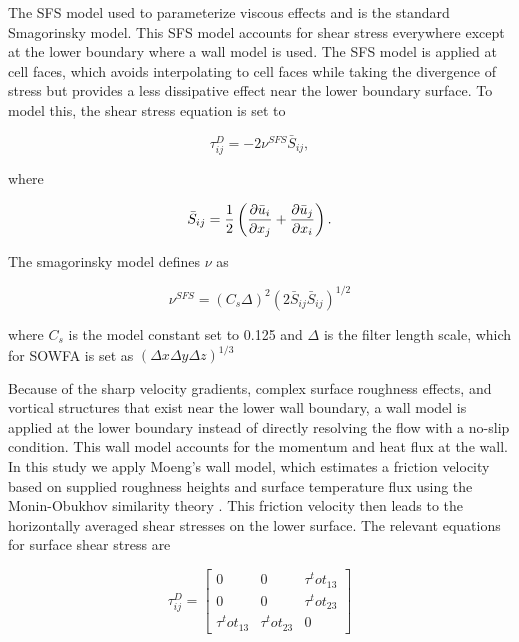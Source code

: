 The SFS model used to parameterize viscous effects and is the standard Smagorinsky model.  This SFS model accounts for shear stress everywhere except at the lower boundary where a wall model is used.  The SFS model is applied at cell faces, which avoids interpolating to cell faces while taking the divergence of stress but provides a less dissipative effect near the lower boundary surface.  To model this, the shear stress equation is set to

\begin{equation}
   \label{eq:smagorinsky}
   \tau^D_{ij} = -2 \nu^{SFS} \bar{S}_{ij},
\end{equation}

where

\begin{equation}
   \bar{S}_{ij} = \frac{1}{2} \left( \frac{\partial \bar{u}_i}{\partial x_j} + \frac{\partial \bar{u}_j}{\partial x_i} \right).
\end{equation}

The smagorinsky model defines $\nu$ as

\begin{equation}
   \nu^{SFS} = (C_s \Delta)^2(2\bar{S}_{ij}\bar{S}_{ij})^{1/2}
\end{equation}

where $C_s$ is the model constant set to 0.125 and $\Delta$ is the filter length scale, which for SOWFA is set as $(\Delta x \Delta y \Delta z)^{1/3}$

Because of the sharp velocity gradients, complex surface roughness effects, and vortical structures that exist near the lower wall boundary, a wall model is applied at the lower boundary instead of directly resolving the flow with a no-slip condition.  This wall model accounts for the momentum and heat flux at the wall.  In this study we apply Moeng's wall model, which estimates a friction velocity based on supplied roughness heights and surface temperature flux using the Monin-Obukhov similarity theory \cite{moeng_large-eddy-simulation_1984}.  This friction velocity then leads to the horizontally averaged shear stresses on the lower surface.  The relevant equations for surface shear stress are 

\begin{equation}
   \label{wall model}
   \tau^D_{ij}=\begin{bmatrix} 0 & 0 & \tau^tot_{13} \\ 0 & 0 & \tau^tot_{23} \\ \tau^tot_{13} & \tau^tot_{23} &0 \end{bmatrix}
\end{equation}

